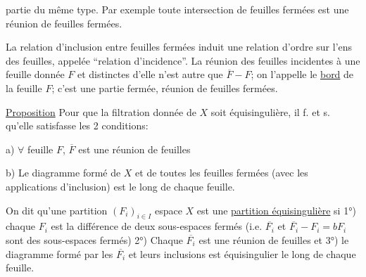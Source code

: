 partie du même type. Par exemple toute intersection de feuilles fermées est une réunion de feuilles fermées.

La relation d'inclusion entre feuilles fermées induit une relation d'ordre sur l'ens des feuilles, appelée ``relation d'incidence''. La réunion des feuilles incidentes à une feuille donnée $F$ et distinctes d'elle n'est autre que $\overline F-F$; on l'appelle le \uline{bord} de la feuille $F$; c'est  une partie fermée, réunion de feuilles fermées.

\uline{Proposition} Pour que la filtration donnée de $X$ soit équisingulière, il f. et s. qu'elle satisfasse les 2 conditions:

a) $\forall$ feuille $F$, $\overline F$ est une réunion de feuilles

b) Le diagramme formé de $X$ et de toutes les feuilles fermées (avec les applications d'inclusion) est   le long de chaque feuille.

On dit qu'une partition $(F_i)_{i\in I}$   espace $X$  est  une \uline{partition équisingulière} si 1°) chaque $F_i$ est la différence de deux sous-espaces fermés (i.e. $\overline{F_i}$ et $\overline{F_i}-F_i=bF_i$ sont des sous-espaces fermés) 2°) Chaque $\overline{F_i}$ est une réunion de feuilles et 3°) le diagramme formé par  les $\overline{F_i}$ et leurs inclusions est équisingulier le long de chaque feuille.
